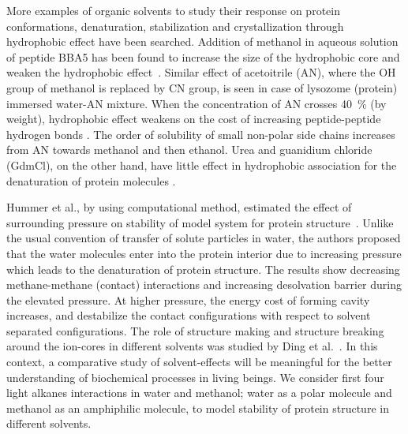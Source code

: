 \begin{sloppypar}
More examples of organic solvents to study their response on protein conformations, denaturation, stabilization and crystallization through hydrophobic effect have been searched. Addition of methanol in aqueous solution of peptide BBA5 has been found to increase the size of the  hydrophobic core and weaken the hydrophobic effect~\citep{Hwang2011}. Similar effect of acetoitrile (AN), where the OH group of methanol is replaced by CN group, is seen in case of lysozome (protein) immersed water-AN mixture. When the concentration of AN crosses 40~\% (by weight), hydrophobic effect weakens on the cost of increasing peptide-peptide hydrogen bonds \citep{Gekko1998}. The order of solubility of small non-polar side chains increases from AN towards methanol and then ethanol. Urea and guanidium chloride (GdmCl), on the other hand, have little effect in hydrophobic association for the denaturation of protein molecules \citep{O'brien2007}. 
\end{sloppypar}

Hummer et al., by using computational method, estimated the effect of surrounding pressure on stability of model system for protein structure~\citep{Hummer1998}. Unlike the usual convention of transfer of solute particles in water, the authors proposed that the water molecules enter into the protein interior due to increasing pressure which leads to the denaturation of protein structure. The results show decreasing methane-methane (contact) interactions and increasing desolvation barrier during the elevated pressure. At higher pressure, the energy cost of forming cavity increases, and destabilize the contact configurations with respect to solvent separated configurations. The role of structure making and structure breaking around the ion-cores in different solvents was studied by Ding et al.~\citep{Ding2014}. In this context, a comparative study of solvent-effects will be meaningful for the better understanding of biochemical processes in living beings. We consider first four light alkanes   interactions in water and methanol; water as a polar molecule and methanol as an amphiphilic molecule, to model stability of protein structure in different solvents. 


